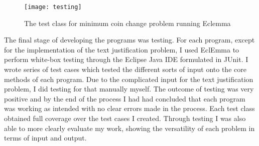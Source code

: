 \begin{figure}[h]
	\centering
	\texttt{[image: testing]}
	\caption{The test class for minimum coin change problem running Eclemma}
\end{figure}

The final stage of developing the programs was testing. For each program, except for the implementation of the text justification problem, I used EclEmma to perform white-box testing through the Eclipse Java IDE formulated in JUnit. I wrote series of test cases which tested the different sorts of input onto the core methods of each program. Due to the complicated input for the text justification problem, I did testing for that manually myself. The outcome of testing was very positive and by the end of the process I had had concluded that each program was working as intended with no clear errors made in the process. Each test class obtained full coverage over the test cases I created. Through testing I was also able to more clearly evaluate my work, showing the versatility of each problem in terms of input and output.


